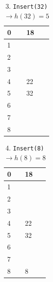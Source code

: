 \documentclass[11pt, letterpaper, titlepage]{article}
\begin{document}
\begin{enumerate}[label=\alph*)]
\begin{paracol}{2}
        \begin{table}[H]
            \small
            \centering
            \caption{3. \texttt{Insert(32)} $\rightarrow h(32) = 5$}
            \begin{tabular}{|m{3em}|m{7em}|}
                \hline
                0 & 18 \\ \hline
                1 &  \\ \hline
                2 &  \\ \hline
                3 &  \\ \hline
                4 & 22 \\ \hline
                5 & 32 \\ \hline
                6 &  \\ \hline
                7 &  \\ \hline
                8 &  \\ \hline
            \end{tabular}
        \end{table}

        \switchcolumn

        \begin{table}[H]
            \small
            \centering
            \caption{4. \texttt{Insert(8)} $\rightarrow h(8) = 8$}
            \begin{tabular}{|m{3em}|m{7em}|}
                \hline
                0 & 18 \\ \hline
                1 &  \\ \hline
                2 &  \\ \hline
                3 &  \\ \hline
                4 & 22 \\ \hline
                5 & 32 \\ \hline
                6 &  \\ \hline
                7 &  \\ \hline
                8 & 8 \\ \hline
            \end{tabular}
        \end{table}

        \switchcolumn


\end{paracol}
\end{enumerate}
\end{document}
